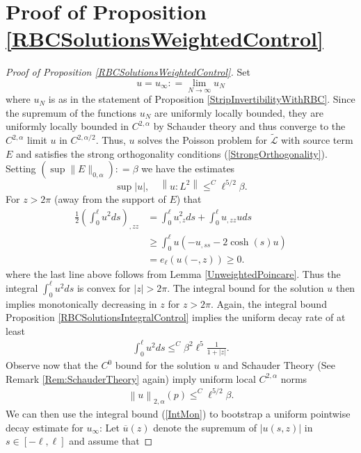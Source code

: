 \documentclass{amsart}
\newcommand{\mc}{\mathcal}
\newcommand{\wt}{\widetilde}
\newcommand{\ol}{\overline}
\begin{document}
\section{Proof of Proposition \ref{RBCSolutionsWeightedControl} } \label{Sec:ProofOfMainTheorem}

 \begin{proof}[Proof of Proposition \ref{RBCSolutionsWeightedControl}]
 Set
 \[
 u = u_{\infty} : = \lim_{N \rightarrow \infty} u_N
 \]
 where $u_N$ is as in the statement of Proposition \ref{StripInvertibilityWithRBC}. Since the supremum of the functions $u_N$ are uniformly locally bounded, they are uniformly locally bounded in $C^{2, \alpha}$ by Schauder theory and thus converge to the $C^{2, \alpha}$ limit $u$ in $C^{2, \alpha/2}$. Thus, $u$ solves the Poisson problem for $\wt{\mc{L}}$ with source term $E$ and satisfies the strong orthogonality conditions (\ref{StrongOrthogonality}). Setting $\left(\sup\| E\|_{0, \alpha} \right) : =  \beta$ we have the  estimates
\[
\sup \left| u\right|, \quad \left\| u: L^2\right\| \leq^C \ell^{5/2} \beta.
\]
For $z > 2\pi$ (away from the support of $E$) that 
\begin{align*}
\frac{1}{2}\left(\int_{0}^\ell u^2 d s \right)_{, zz} &=  \int_{0}^\ell u_{, z}^2 d s + \int_{0}^\ell u_{, zz} u ds \\
& \geq \int_{0}^\ell u \left( -u_{, ss} - 2 \cosh(s) u \right) \\
& = e_{\ell} (u(-, z)) \geq 0.
\end{align*}
where the last line above follows from Lemma \ref{UnweightedPoincare}. Thus the integral $\int_{0}^\ell u^2 ds$ is convex for $|z| > 2 \pi$. The integral bound for the solution $u$   then implies monotonically decreasing in $z$ for $z > 2\pi$. Again, the integral bound Proposition \ref{RBCSolutionsIntegralControl} implies the uniform decay rate of at least
\begin{align}\label{IntMon}
\int_0^{\ell} u^2 ds \leq^C  \beta^2 \ell^{5}\frac{1}{1 + |z|}.
\end{align}
 Observe now that the  $C^0$ bound for the solution $u$ and Schauder Theory (See Remark \ref{Rem:SchauderTheory} again) imply uniform local $C^{2, \alpha}$ norms 
\begin{align}\label{BootStrap1}
\left\| u\right\|_{2, \alpha} (p) \leq^C \ell^{5/2} \beta.
\end{align} 
We can then use the integral bound (\ref{IntMon}) to bootstrap a uniform pointwise decay estimate for  $u_{\infty}$: Let $\ol{u} (z)$ denote the supremum of $\left|u(s,z)\right|$  in $s \in [-\ell, \ell]$ and assume that 

\end{proof}
\end{document}
